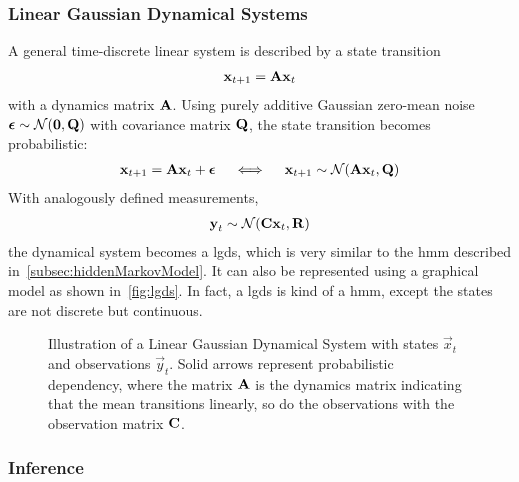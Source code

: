 	\subsubsection{Linear Gaussian Dynamical Systems}
		A general time-discrete linear system is described by a state transition
		\begin{align*}
			\boldsymbol{\mathrm{x}}_{t + 1} = \boldsymbol{\mathrm{A}} \boldsymbol{\mathrm{x}}_t
		\end{align*}
		with a dynamics matrix \(\boldsymbol{\mathrm{A}}\). Using purely additive Gaussian zero-mean noise \( \boldsymbol{\mathrm{\epsilon}} \sim \mathcal{N}(\boldsymbol{\mathrm{0}}, \boldsymbol{\mathrm{Q}}) \) with covariance matrix \( \boldsymbol{\mathrm{Q}} \), the state transition becomes probabilistic:
		\begin{align*}
			\boldsymbol{\mathrm{x}}_{t + 1} = \boldsymbol{\mathrm{A}} \boldsymbol{\mathrm{x}}_t + \boldsymbol{\mathrm{\epsilon}} \quad\iff\quad \boldsymbol{\mathrm{x}}_{t + 1} \sim \mathcal{N}(\boldsymbol{\mathrm{A}} \boldsymbol{\mathrm{x}}_t, \boldsymbol{\mathrm{Q}})
		\end{align*}
		With analogously defined measurements,
		\begin{align*}
			\boldsymbol{\mathrm{y}}_t \sim \mathcal{N}(\boldsymbol{\mathrm{C}} \boldsymbol{\mathrm{x}}_t, \boldsymbol{\mathrm{R}})
		\end{align*}
		the dynamical system becomes a \ac{lgds}, which is very similar to the \ac{hmm} described in~\autoref{subsec:hiddenMarkovModel}. It can also be represented using a graphical model as shown in~\autoref{fig:lgds}. In fact, a \ac{lgds} is kind of a \ac{hmm}, except the states are not discrete but continuous.

		\begin{figure}
			\centering
			\tikzLinearGaussianDynamicalSystem
			\caption{Illustration of a Linear Gaussian Dynamical System with states \(\vec{x}_t\) and observations \(\vec{y}_t\). Solid arrows represent probabilistic dependency, where the matrix \(\boldsymbol{\mathrm{A}}\) is the dynamics matrix indicating that the mean transitions linearly, so do the observations with the observation matrix \(\boldsymbol{\mathrm{C}}\).}
			\label{fig:lgds}
		\end{figure}

	\subsubsection{Inference}

